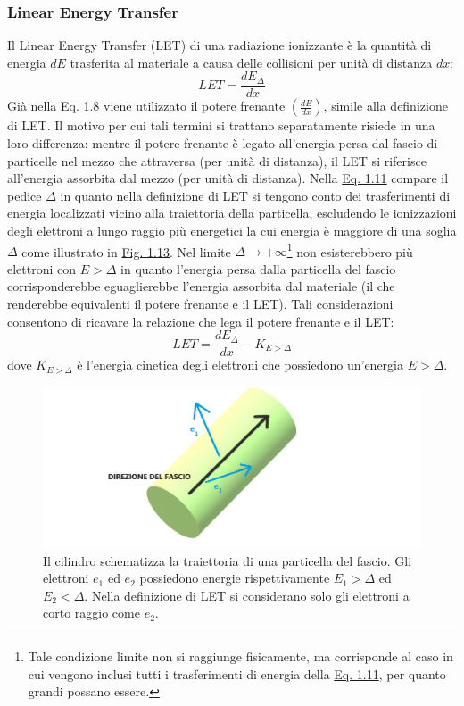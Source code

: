 \documentclass[12pt,a4paper,twoside]{report}
\begin{document}
	\subsubsection{Linear Energy Transfer}\label{par:let}
	Il Linear Energy Transfer (LET) di una radiazione ionizzante è la quantità di energia $dE$ trasferita al materiale a causa delle collisioni per unità di distanza $dx$:
	\begin{equation}
		LET=\frac{dE_\Delta}{dx}
		\label{eq:let}
	\end{equation}
	Già nella \hyperref[eq:dose_as]{Eq. 1.8} viene utilizzato il potere frenante $\left(\frac{dE}{dx}\right)$, simile alla definizione di LET. Il motivo per cui tali termini si trattano separatamente risiede in una loro differenza: mentre il potere frenante è legato all'energia persa dal fascio di particelle nel mezzo che attraversa (per unità di distanza), il LET si riferisce all'energia assorbita dal mezzo (per unità di distanza). Nella \hyperref[eq:let]{Eq. 1.11} compare il pedice $\Delta$ in quanto nella definizione di LET si tengono conto dei trasferimenti di energia localizzati vicino alla traiettoria della particella, escludendo le ionizzazioni degli elettroni a lungo raggio più energetici la cui energia è maggiore di una soglia $\Delta$ come illustrato in \hyperref[fig:let]{Fig. 1.13}. Nel limite $\Delta\rightarrow+\infty$\footnote{Tale condizione limite non si raggiunge fisicamente, ma corrisponde al caso in cui vengono inclusi tutti i trasferimenti di energia della \hyperref[eq:let]{Eq. 1.11}, per quanto grandi possano essere.} non esisterebbero più elettroni con $E>\Delta$ in quanto l'energia persa dalla particella del fascio corrisponderebbe eguaglierebbe l'energia assorbita dal materiale (il che renderebbe equivalenti il potere frenante e il LET). Tali considerazioni consentono di ricavare la relazione che lega il potere frenante e il LET:
	\begin{equation}
		LET=\frac{dE_\Delta}{dx}-K_{E>\Delta}
		\label{eq:let&stoppingpower}
	\end{equation}
	dove $K_{E>\Delta}$ è l'energia cinetica degli elettroni che possiedono un'energia $E>\Delta$.
	
	\begin{figure}[H]
		\centering
		\includegraphics[width=0.9\linewidth]{let.jpg}
		\caption{Il cilindro schematizza la traiettoria di una particella del fascio. Gli elettroni $e_1$ ed $e_2$ possiedono energie rispettivamente $E_1>\Delta$ ed $E_2<\Delta$. Nella definizione di LET si considerano solo gli elettroni a corto raggio come $e_2$.}
		\label{fig:let}
	\end{figure}
	
\end{document}
